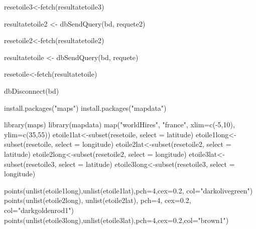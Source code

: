 \documentclass[mstat,12pt]{unswthesis}
\newenvironment{Shaded}{\begin{snugshade}}{\end{snugshade}}
\newcommand{\AttributeTok}[1]{\textcolor[rgb]{0.77,0.63,0.00}{#1}}
\newcommand{\DecValTok}[1]{\textcolor[rgb]{0.00,0.00,0.81}{#1}}
\newcommand{\FloatTok}[1]{\textcolor[rgb]{0.00,0.00,0.81}{#1}}
\newcommand{\FunctionTok}[1]{\textcolor[rgb]{0.00,0.00,0.00}{#1}}
\newcommand{\NormalTok}[1]{#1}
\newcommand{\OtherTok}[1]{\textcolor[rgb]{0.56,0.35,0.01}{#1}}
\newcommand{\SpecialCharTok}[1]{\textcolor[rgb]{0.00,0.00,0.00}{#1}}
\newcommand{\StringTok}[1]{\textcolor[rgb]{0.31,0.60,0.02}{#1}}
\begin{document}
\begin{Shaded}
\begin{Highlighting}[]
\NormalTok{resetoile3}\OtherTok{\textless{}{-}}\FunctionTok{fetch}\NormalTok{(resultatetoile3)}

\NormalTok{resultatetoile2 }\OtherTok{\textless{}{-}} \FunctionTok{dbSendQuery}\NormalTok{(bd, requete2)}

\NormalTok{resetoile2}\OtherTok{\textless{}{-}}\FunctionTok{fetch}\NormalTok{(resultatetoile2)}

\NormalTok{resultatetoile }\OtherTok{\textless{}{-}} \FunctionTok{dbSendQuery}\NormalTok{(bd, requete)}

\NormalTok{resetoile}\OtherTok{\textless{}{-}}\FunctionTok{fetch}\NormalTok{(resultatetoile)}

\FunctionTok{dbDisconnect}\NormalTok{(bd)}

\FunctionTok{install.packages}\NormalTok{(}\StringTok{"maps"}\NormalTok{)}
\FunctionTok{install.packages}\NormalTok{(}\StringTok{"mapdata"}\NormalTok{)}

\FunctionTok{library}\NormalTok{(maps)}
\FunctionTok{library}\NormalTok{(mapdata)}
\FunctionTok{map}\NormalTok{(}\StringTok{"worldHires"}\NormalTok{, }\StringTok{"france"}\NormalTok{, }\AttributeTok{xlim=}\FunctionTok{c}\NormalTok{(}\SpecialCharTok{{-}}\DecValTok{5}\NormalTok{,}\DecValTok{10}\NormalTok{), }\AttributeTok{ylim=}\FunctionTok{c}\NormalTok{(}\DecValTok{35}\NormalTok{,}\DecValTok{55}\NormalTok{))}
\NormalTok{etoile1lat}\OtherTok{\textless{}{-}}\FunctionTok{subset}\NormalTok{(resetoile, }\AttributeTok{select =}\NormalTok{ latitude)}
\NormalTok{etoile1long}\OtherTok{\textless{}{-}}\FunctionTok{subset}\NormalTok{(resetoile, }\AttributeTok{select =}\NormalTok{ longitude)}
\NormalTok{etoile2lat}\OtherTok{\textless{}{-}}\FunctionTok{subset}\NormalTok{(resetoile2, }\AttributeTok{select =}\NormalTok{ latitude)}
\NormalTok{etoile2long}\OtherTok{\textless{}{-}}\FunctionTok{subset}\NormalTok{(resetoile2, }\AttributeTok{select =}\NormalTok{ longitude)}
\NormalTok{etoile3lat}\OtherTok{\textless{}{-}}\FunctionTok{subset}\NormalTok{(resetoile3, }\AttributeTok{select =}\NormalTok{ latitude)}
\NormalTok{etoile3long}\OtherTok{\textless{}{-}}\FunctionTok{subset}\NormalTok{(resetoile3, }\AttributeTok{select =}\NormalTok{ longitude)}

\FunctionTok{points}\NormalTok{(}\FunctionTok{unlist}\NormalTok{(etoile1long),}\FunctionTok{unlist}\NormalTok{(etoile1lat),}\AttributeTok{pch=}\DecValTok{4}\NormalTok{,}\AttributeTok{cex=}\FloatTok{0.2}\NormalTok{, }\AttributeTok{col=}\StringTok{"darkolivegreen"}\NormalTok{)}
\FunctionTok{points}\NormalTok{(}\FunctionTok{unlist}\NormalTok{(etoile2long), }\FunctionTok{unlist}\NormalTok{(etoile2lat), }\AttributeTok{pch=}\DecValTok{4}\NormalTok{, }\AttributeTok{cex=}\FloatTok{0.2}\NormalTok{, }\AttributeTok{col=}\StringTok{"darkgoldenrod1"}\NormalTok{)}
\FunctionTok{points}\NormalTok{(}\FunctionTok{unlist}\NormalTok{(etoile3long),}\FunctionTok{unlist}\NormalTok{(etoile3lat),}\AttributeTok{pch=}\DecValTok{4}\NormalTok{,}\AttributeTok{cex=}\FloatTok{0.2}\NormalTok{,}\AttributeTok{col=}\StringTok{"brown1"}\NormalTok{)}
\end{Highlighting}
\end{Shaded}
\end{document}
